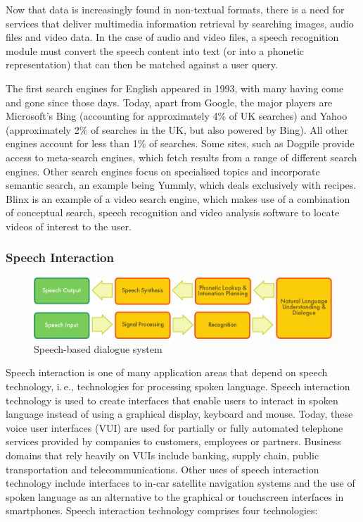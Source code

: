 \begin{multicols}{2}
Now that data is increasingly found in non-textual formats, there is a need for services that deliver multimedia information retrieval by searching images, audio files and video data. In the case of audio and video files, a speech recognition module must convert the speech content into text (or into a phonetic representation) that can then be matched against a user query.

The first search engines for English appeared in 1993, with many having come and gone since those days. Today, apart from Google, the major players are Microsoft’s Bing (accounting for approximately 4\% of UK searches) and Yahoo (approximately 2\% of searches in the UK, but also powered by Bing). All other engines account for less than 1\% of searches. Some sites, such as Dogpile provide access to meta-search engines, which fetch results from a range of different search engines. Other search engines focus on specialised topics and incorporate semantic search, an example being Yummly, which deals exclusively with recipes. Blinx is an example of a video search engine, which makes use of a combination of conceptual search, speech recognition and video analysis software to locate videos of interest to the user.

\subsubsection{Speech Interaction}

\begin{figure}[htb]
  \center
  \includegraphics[width=\textwidth]{../_media/english/simple_speech-based_dialogue_architecture}
  \caption{Speech-based dialogue system}
  \label{fig:dialoguearch_en}
\end{figure}

Speech interaction is one of many application areas that depend on speech technology, i.\,e., technologies for processing spoken language. Speech interaction technology is used to create interfaces that enable users to interact in spoken language instead of using a graphical display, keyboard and mouse. Today, these voice user interfaces (VUI) are used for partially or fully automated telephone services provided by companies to customers, employees or partners. Business domains that rely heavily on VUIs include banking, supply chain, public transportation and telecommunications. Other uses of speech interaction technology include interfaces to in-car satellite navigation systems and the use of spoken language as an alternative to the graphical or touchscreen interfaces in smartphones. Speech interaction technology comprises four technologies:


\end{multicols}
